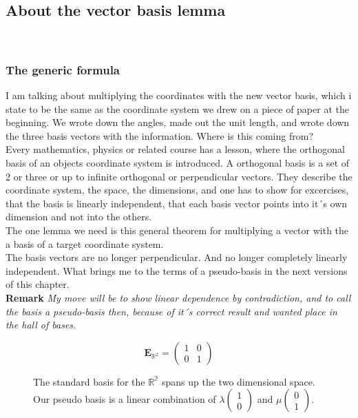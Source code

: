 \documentclass[a4paper]{article}
\begin{document}
\subsection{About the vector basis lemma}\\

\subsubsection{The generic formula}


I am talking about multiplying the coordinates with the new vector basis, which i state to be the same as the coordinate system we drew on a piece of paper at the beginning. We wrote down the angles, made out the unit length, and wrote down the three basis vectors with the information. Where is this coming from?\\

Every mathematics, physics or related course has a lesson, where the orthogonal basis of an objects coordinate system is introduced. 
A orthogonal basis is a set of 2 or three or up to infinite orthogonal or perpendicular vectors. They describe the coordinate system, the space, the dimensions, and one has to show for excercises, that the basis is linearly independent, that each basis vector points into it´s own dimension and not into the others.\\

The one lemma we need is this general theorem for multiplying a vector with the a basis of a target coordinate system.\\

The basis vectors are no longer perpendicular. And no longer completely linearly independent. What brings me to the terms of a pseudo-basis in the next versions of this chapter.\\

\textbf{Remark} \emph{My move will be to show linear dependence by contradiction, and to call the basis a pseudo-basis then,
because of it´s correct result and wanted place in the hall of bases.}\\
\begin{figure}
\begin{displaymath}
    \boldsymbol{E}_{\mathbb{R}^2} = \begin{pmatrix}1 & 0 \\ 0 & 1\end{pmatrix}    
\end{displaymath}
\caption{The standard basis for the $\mathbb{R^{2}}$ spans up the two dimensional space. Our pseudo basis is a linear combination of $\lambda\begin{pmatrix}1\\0\end{pmatrix}$ and $\mu\begin{pmatrix}0\\1\end{pmatrix}$.}
\end{figure}
\end{document}
